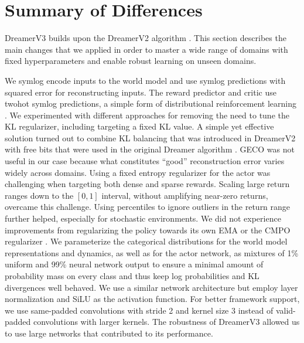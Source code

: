 \section{Summary of Differences}
\label{sec:diff}

DreamerV3 builds upon the DreamerV2 algorithm \citep{hafner2020dreamerv2}. This section describes the main changes that we applied in order to master a wide range of domains with fixed hyperparameters and enable robust learning on unseen domains.

\begin{itemize}
 We symlog encode inputs to the world model and use symlog predictions with squared error for reconstructing inputs. The reward predictor and critic use twohot symlog predictions, a simple form of distributional reinforcement learning \citep{bellemare2017c51}.
 We experimented with different approaches for removing the need to tune the KL regularizer, including targeting a fixed KL value. A simple yet effective solution turned out to combine KL balancing that was introduced in DreamerV2 \citep{hafner2020dreamerv2} with free bits \citep{kingma2016freebits} that were used in the original Dreamer algorithm \citep{hafner2019dreamer}. GECO \citep{rezende2018geco} was not useful in our case because what constitutes ``good'' reconstruction error varies widely across domains.
 Using a fixed entropy regularizer for the actor was challenging when targeting both dense and sparse rewards. Scaling large return ranges down to the $[0, 1]$ interval, without amplifying near-zero returns, overcame this challenge. Using percentiles to ignore outliers in the return range further helped, especially for stochastic environments. We did not experience improvements from regularizing the policy towards its own EMA \citep{hilton2021ewmappo} or the CMPO regularizer \citep{hessel2021muesli}.
 We parameterize the categorical distributions for the world model representations and dynamics, as well as for the actor network, as mixtures of 1\% uniform and 99\% neural network output \citep{wiering1999unimix,gruslys2017reactor} to ensure a minimal amount of probability mass on every class and thus keep log probabilities and KL divergences well behaved.
 We use a similar network architecture but employ layer normalization \citep{ba2016layernorm} and SiLU \citep{hendrycks2016silu} as the activation function. For better framework support, we use same-padded convolutions with stride 2 and kernel size 3 instead of valid-padded convolutions with larger kernels. The robustness of DreamerV3 allowed us to use large networks that contributed to its performance.

\end{itemize}

